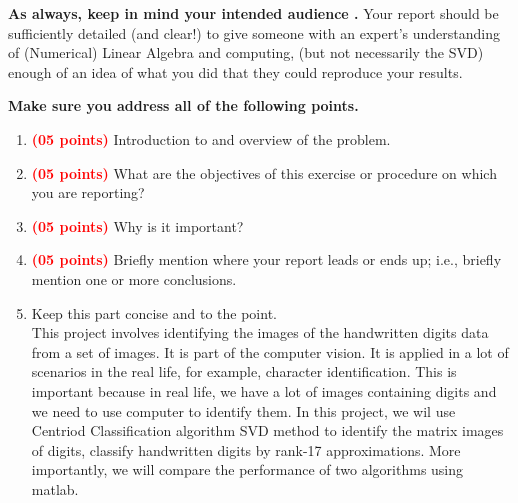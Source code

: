 \documentclass[dvipsnames,12pt]{article} %
\newcommand{\Brd}[1]{{\textbf{\textcolor{Red}{#1}}}}               %
\newcommand{\Brp}[1]{\textbf{\textcolor{RoyalPurple}{#1}}}         %
\newcommand{\Brm}[1]{\textbf{\textcolor[rgb]{0.69,0.19,0.38}{#1}}} %
\begin{document}
      \vspace{06pt}

      \Brp{As always, keep in mind your intended audience .}
      Your report should be sufficiently detailed (and clear!) to give someone with an expert's
      understanding of (Numerical) Linear Algebra and computing, (but not necessarily the SVD)
      enough of an idea of what you did that they could reproduce your results.

      \vspace{06pt}

      \Brm{Make sure you address all of the following points.}

      \begin{enumerate}[label=\textbf{(\alph*}), leftmargin=48pt]

        \item \Brd{(05 points)} Introduction to and overview of the problem.

        \item \Brd{(05 points)} What are the objectives of this exercise or procedure on which you
          are reporting?

        \item \Brd{(05 points)} Why is it important?

        \item \Brd{(05 points)} Briefly mention where your report leads or ends up; i.e., briefly
          mention one or more conclusions.

        \item Keep this part concise and to the point.\\
        
       \vspace{06pt}
This project involves identifying the images of the handwritten digits data from a set of images. It is part of the computer vision. It is applied in a lot of scenarios in the real life, for example, character identification. This is important because in real life, we have a lot of images containing digits and we need to use computer to identify them.  In this project, we wil use Centriod Classification algorithm SVD method to identify the matrix images of digits, classify handwritten digits by rank-17 approximations. More importantly, we will compare the performance of two algorithms using matlab.
      \end{enumerate}

\end{document}
